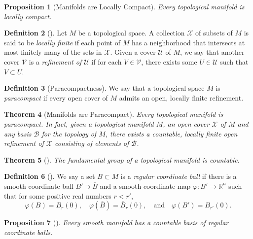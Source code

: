 \documentclass[reqno]{amsart}
\newtheorem{theorem}{Theorem}[section]
\newtheorem{proposition}[theorem]{Proposition}
\theoremstyle{definition}
\newtheorem{definition}[theorem]{Definition}
\theoremstyle{remark}
\begin{document}
\begin{proposition}[Manifolds are Locally Compact]
    Every topological manifold is
    locally compact.
\end{proposition}

\begin{definition}[]
    Let $M$ be a topological space. A collection
    $\mathcal{X}$ of subsets of $M$ is said to be
    \textit{locally finite} if each point of $M$ has
    a neighborhood that intersects at most finitely many
    of the sets in $\mathcal{X}$. Given a cover
    $\mathcal{U}$ of $M$, we say that another cover
    $\mathcal{V}$ is a \textit{refinement of $\mathcal{U}$ }
    if for each $V \in \mathcal{V}$, there exists
    some $U \in \mathcal{U}$ such that
    $V \subset U$. 
\end{definition}

\begin{definition}[Paracompactness]
    We say that a topological space $M$ is 
    \textit{paracompact} if every open cover of $M$ admits
    an open, locally finite refinement.
\end{definition}

\begin{theorem}[Manifolds are Paracompact]
    Every topological manifold is paracompact.
    In fact, given a topological manifold $M$, an
    open cover $\mathcal{X}$ of $M$ and any basis
    $\mathcal{B}$ for the topology of $M$, there
    exists a countable, locally finite open
    refinement of $\mathcal{X}$ consisting of elements
    of $\mathcal{B}$.
\end{theorem}

\begin{theorem}[]
    The fundamental group of a topological manifold is
    countable.
\end{theorem}


\begin{definition}[]
    We say a set $B \subset M$ is a \textit{regular coordinate
    ball} if there is a smooth coordinate ball
    $B' \supset \overline{B}$ and a smooth coordinate
    map $\varphi \colon B' \to \mathbb{R}^{n}$ such that
    for some positive real numbers $r < r'$,
    \[
    \varphi (B) = B_r (0), \quad
    \varphi \left( \overline{B} \right) 
    = \overline{B}_r (0), \quad \text{and} \quad
    \varphi (B') = B_{r'}(0).
    \] 
\end{definition}


\begin{proposition}[]\label{Mfds-regular-coordinate-balls}
    Every smooth manifold has a countable basis of
    regular coordinate balls.
\end{proposition}
\end{document}
